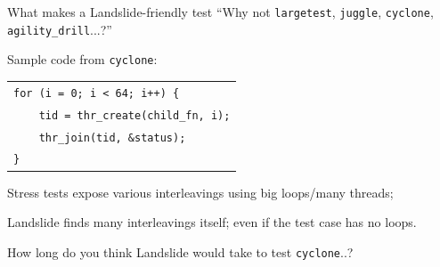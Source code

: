 \documentclass[xcolor=dvipsnames]{beamer}
\begin{document}
\begin{frame}{What makes a Landslide-friendly test}
	``Why not {\tt largetest}, {\tt juggle}, {\tt cyclone}, {\tt agility\_drill}...?''
	\linegap

	Sample code from {\tt cyclone}: %
	\begin{center}
	\begin{tabular}{l}
		\texttt{for (i = 0; i < 64; i++) \{} \\
		\texttt{~~~~tid = thr\_create(child\_fn, i);} \\
		\texttt{~~~~thr\_join(tid, \&status);} \\
		\texttt{\}}
	\end{tabular}
	\end{center}
	\pause
	\linegap

	Stress tests expose various interleavings using big loops/many threads;
	\linegap

	Landslide finds many interleavings itself; even if the test case has no loops.
	\vspace{0.01in}

	How long do you think Landslide would take to test {\tt cyclone}..?
\end{frame}
\end{document}
